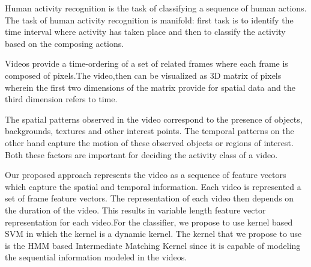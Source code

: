 \begin{abstracts}  
\normalsize
\setlength{\parskip}{10pt plus 5pt minus 3pt}
\setlength{\parindent}{20pt}%

Human activity recognition is the task of classifying a sequence of human actions. The task of human activity recognition is manifold: first task is to identify the time interval where activity has taken place and then to classify the activity based on the composing actions. 

Videos provide a time-ordering of a set of related frames where each frame is composed of pixels.The video,then can be visualized as 3D matrix of pixels wherein the first two dimensions of the matrix provide for spatial data and the third dimension refers to time.

The spatial patterns observed in the video correspond to the presence of objects,
backgrounds, textures and other interest points. The temporal patterns on the other hand capture the motion of these observed objects or regions of interest. Both these factors are important for deciding the activity class of a video.

Our proposed approach represents the video as a sequence of feature vectors which capture the spatial and temporal information. Each video is represented a set of frame feature vectors. The representation of each video then depends on the duration of the video. This results in variable length feature vector representation for each video.For the classifier, we propose to use kernel based SVM in which the kernel is a dynamic kernel. The kernel that we propose to use is the HMM based Intermediate Matching Kernel since it is capable of modeling the sequential information modeled in the videos.
\end{abstracts}


